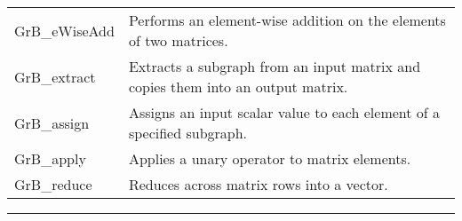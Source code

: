 \begin{table}[h]
\begin{center}
\begin{tabular}{lp{5.25cm}}
	{\sf GrB\_eWiseAdd}         & Performs an element-wise addition on the elements of two matrices.                  \\
	{\sf GrB\_extract}          & Extracts a subgraph from an input matrix and copies them into an output matrix.        \\
	{\sf GrB\_assign}           & Assigns an input scalar value to each element of a specified subgraph.              \\
	{\sf GrB\_apply}            & Applies a unary operator to matrix elements.                                 \\
	{\sf GrB\_reduce}           & Reduces across matrix rows into a vector.                    \\
\end{tabular}
\end{center}
\hrule
\end{table}


